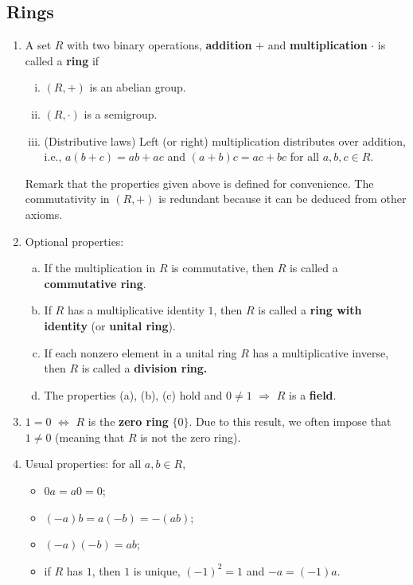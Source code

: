 \subsection*{Rings}
\begin{enumerate}[(1)]
	\item A set $R$ with two binary operations, \textbf{addition} $+$ and \textbf{multiplication} $\cdot$ is called a \textbf{ring} if 
	\begin{enumerate}[(i)]
		\item $(R,+)$ is an abelian group.
		\item $(R,\cdot)$ is a semigroup.
		\item (Distributive laws) Left (or right) multiplication distributes over addition, i.e., $a(b+c) = ab+ac$ and $(a+b)c = ac+bc$ for all $a,b,c\in R$.
	\end{enumerate}
	Remark that the properties given above is defined for convenience. The commutativity in $(R,+)$ is redundant because it can be deduced from other axioms.
	\item Optional properties:
	\begin{enumerate}[(a)]
		\item If the multiplication in $R$ is commutative, then $R$ is called a \textbf{commutative ring}.
		\item If $R$ has a multiplicative identity $1$, then $R$ is called a \textbf{ring with identity} (or \textbf{unital ring}).
		\item If each nonzero element in a unital ring $R$ has a multiplicative inverse, then $R$ is called a \textbf{division ring.}
		\item The properties (a), (b), (c) hold and $0\neq 1$ $\Rightarrow$ $R$ is a \textbf{field}.
	\end{enumerate}
	\item $1= 0 $ $\Leftrightarrow$ $R$ is the \textbf{zero ring} $\{0\}$. Due to this result, we often impose that $1\neq 0$ (meaning that $R$ is not the zero ring).
	\item Usual properties: for all $a,b\in R$,
	\begin{itemize}
		\item $0a = a0 = 0$;
		\item $(-a)b = a(-b) = -(ab)$;
		\item $(-a)(-b) = ab$;
	\item if $R$ has $1$, then $1$ is unique, $(-1)^2=1$ and $-a = (-1)a$.
	\end{itemize}
\end{enumerate}

